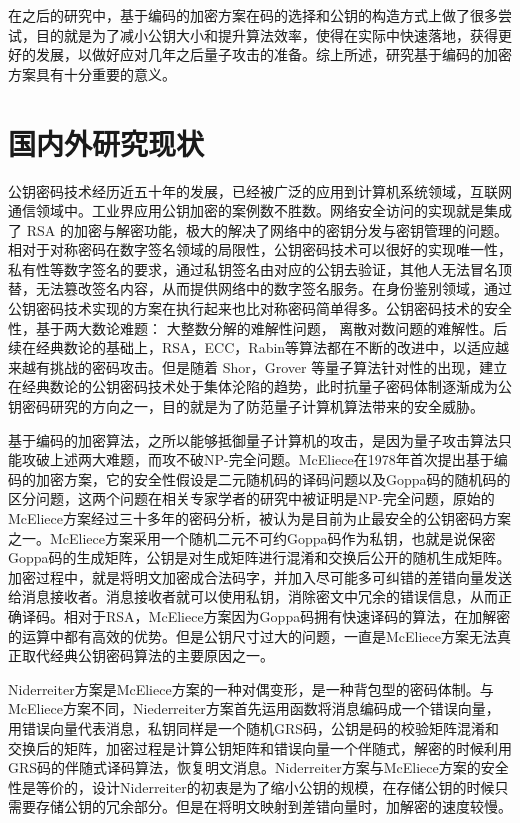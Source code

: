 在之后的研究中，基于编码的加密方案在码的选择和公钥的构造方式上做了很多尝试，目的就是为了减小公钥大小和提升算法效率，使得在实际中快速落地，获得更好的发展，以做好应对几年之后量子攻击的准备。综上所述，研究基于编码的加密方案具有十分重要的意义。


\section{国内外研究现状}
公钥密码技术经历近五十年的发展，已经被广泛的应用到计算机系统领域，互联网通信领域中。工业界应用公钥加密的案例数不胜数。网络安全访问的实现就是集成了 RSA 的加密与解密功能，极大的解决了网络中的密钥分发与密钥管理的问题。相对于对称密码在数字签名领域的局限性，公钥密码技术可以很好的实现唯一性，私有性等数字签名的要求，通过私钥签名由对应的公钥去验证，其他人无法冒名顶替，无法篡改签名内容，从而提供网络中的数字签名服务。在身份鉴别领域，通过公钥密码技术实现的方案在执行起来也比对称密码简单得多。公钥密码技术的安全性，基于两大数论难题： 大整数分解的难解性问题， 离散对数问题的难解性。后续在经典数论的基础上，RSA，ECC，Rabin等算法都在不断的改进中，以适应越来越有挑战的密码攻击。但是随着 Shor，Grover 等量子算法针对性的出现，建立在经典数论的公钥密码技术处于集体沦陷的趋势，此时抗量子密码体制逐渐成为公钥密码研究的方向之一，目的就是为了防范量子计算机算法带来的安全威胁。

基于编码的加密算法，之所以能够抵御量子计算机的攻击，是因为量子攻击算法只能攻破上述两大难题，而攻不破{NP-}完全问题。McEliece在1978年首次提出基于编码的加密方案，它的安全性假设是二元随机码的译码问题以及Goppa码的随机码的区分问题，这两个问题在相关专家学者的研究中被证明是{NP-}完全问题，原始的McEliece方案经过三十多年的密码分析，被认为是目前为止最安全的公钥密码方案之一。McEliece方案采用一个随机二元不可约Goppa码作为私钥，也就是说保密Goppa码的生成矩阵，公钥是对生成矩阵进行混淆和交换后公开的随机生成矩阵。加密过程中，就是将明文加密成合法码字，并加入尽可能多可纠错的差错向量发送给消息接收者。消息接收者就可以使用私钥，消除密文中冗余的错误信息，从而正确译码。相对于RSA，McEliece方案因为Goppa码拥有快速译码的算法，在加解密的运算中都有高效的优势。但是公钥尺寸过大的问题，一直是McEliece方案无法真正取代经典公钥密码算法的主要原因之一。

Niderreiter方案是McEliece方案的一种对偶变形，是一种背包型的密码体制。与McEliece方案不同，Niederreiter方案首先运用函数将消息编码成一个错误向量，用错误向量代表消息，私钥同样是一个随机GRS码，公钥是码的校验矩阵混淆和交换后的矩阵，加密过程是计算公钥矩阵和错误向量一个伴随式，解密的时候利用GRS码的伴随式译码算法，恢复明文消息。Niderreiter方案与McEliece方案的安全性是等价的，设计Niderreiter的初衷是为了缩小公钥的规模，在存储公钥的时候只需要存储公钥的冗余部分。但是在将明文映射到差错向量时，加解密的速度较慢。

